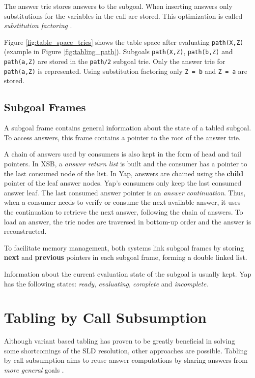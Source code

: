 The answer trie stores answers to the subgoal. When inserting answers only substitutions
for the variables in the call are stored. This optimization is called \textit{substitution factoring} \cite{RamakrishnanIV-95}.

Figure \ref{fig:table_space_tries} shows the table space after evaluating \texttt{path(X,Z)} (example in Figure \ref{fig:tabling_path}).
Subgoals \texttt{path(X,Z)}, \texttt{path(b,Z)} and \texttt{path(a,Z)} are stored in the \texttt{path/2} subgoal trie.
Only the answer trie for \texttt{path(a,Z)} is represented. Using substitution factoring only \texttt{Z = b} and \texttt{Z = a}
are stored.

\subsection{Subgoal Frames}

A subgoal frame contains general information about the state of a tabled subgoal.
To access answers, this frame contains a pointer to the root of the answer trie.

A chain of answers used by consumers is also kept in the form of head and tail pointers.
In XSB, a \textit{answer return list} is built and the consumer has a pointer to the last consumed node of the list.
In Yap, answers are chained using the \textbf{child} pointer of the leaf answer nodes. Yap's consumers only keep
the last consumed answer leaf. The last consumed answer pointer is an \textit{answer continuation}. Thus, when
a consumer needs to verify or consume the next available answer, it uses the continuation to retrieve the next
answer, following the chain of answers. To load an answer, the trie nodes are traversed in bottom-up order and the answer is reconstructed.

To facilitate memory management, both systems link subgoal frames by storing \textbf{next} and \textbf{previous} pointers in each subgoal frame,
forming a double linked list.

Information about the current evaluation state of the subgoal is usually kept. Yap has the following states:
\textit{ready}, \textit{evaluating}, \textit{complete} and \textit{incomplete}.

\section{Tabling by Call Subsumption} \label{sec:subsumption}

Although variant based tabling has proven to be greatly beneficial in solving some shortcomings of the SLD resolution,
other approaches are possible. Tabling by call subsumption aims to reuse answer computations by sharing answers from
\textit{more general} goals \cite{Johnson-99}.


